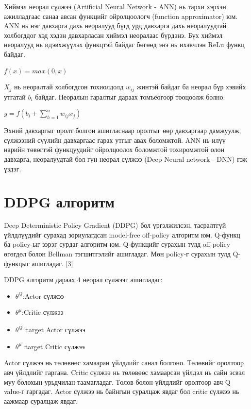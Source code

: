 \documentclass[12pt,A4]{report}
\begin{document}
Хиймэл неорал сүлжээ (Artificial Neural Network - ANN) нь тархи хэрхэн ажилладгаас санаа авсан функцийг ойролцоологч (function approximator) юм. ANN нь нэг давхарга дахь неоралууд бүгд урд давхарга дахь неоралуудтай холбогддог хэд хэдэн давхарласан хиймэл неоралаас бүрдэнэ. Бүх хиймэл неоралууд нь идэвхжүүлэх функцтэй байдаг бөгөөд энэ нь ихэвчлэн ReLu функц байдаг. 

\begin{center}
$f(x)=max(0, x)$
\end{center}

$X_j$ нь неоралтай холбогдсон тохиолдолд $w_{ij}$ жинтэй байдаг ба неорал бүр хэвийх утгатай $b_i$ байдаг. Неоралын гаралтыг дараах томъёогоор тооцоолж болно:

\begin{center}
$y=f(b_i+\sum_{h=1}^{n}w_{ij} x_j)$
\end{center}

Эхний давхаргыг оролт болгон ашигласнаар оролтыг өөр давхаргаар дамжуулж, сүлжээний сүүлийн давхаргаас гарах утгыг авах боломжтой. ANN нь илүү нарийн төвөгтэй функцуудийг ойролцоолох боломжтой тохиромжтой олон давхарга, неоралуудтай бол гүн неорал сүлжээ (Deep Neural network - DNN) гэж үздэг. 

\section{DDPG алгоритм}

Deep Deterministic Policy Gradient (DDPG) бол үргэлжилсэн, тасралтгүй үйлдлүүдийг сурахад зориулагдсан model-free off-policy алгоритм юм. Q-функц ба policy-ыг зэрэг сурдаг алгоритм юм. Q-функцийг сурахын тулд off-policy өгөгдөл болон Bellman тэгшитгэлийг ашигладаг. Мөн policy-г сурахын тулд Q-функцыг ашигладаг.  [3]

DDPG алгоритм дараах 4 неорал сүлжээг ашигладаг:
\begin{itemize}
	\item ${\theta}^Q$:Actor сүлжээ
	\item ${\theta}^{\mu}$:Critic сүлжээ
	\item ${\theta}^{Q^{'}}$:target Actor сүлжээ
	\item ${\theta}^{{\mu}^{'}}$:target Critic сүлжээ
\end{itemize} 
 
Actor сүлжээ нь төлөвөөс хамааран үйлдлийг санал болгоно. Төлөвийг оролтоор авч үйлдлийг гаргана. Critic сүлжээ нь төлөвөөс хамаарсан үйлдэл нь сайн эсвэл муу болохын урьдчилан таамагладаг. Төлөв болон үйлдлийг оролтоор авч Q-value-г гаргадаг. Actor сүлжээ нь байнгын суралцаж явдаг бол critic сүлжээ нь аажмаар суралцаж явдаг.
\end{document}
